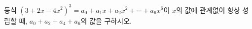 등식 $(3+2x-4x^2)^3=a_0+a_1x+a_2x^2+\cdots+a_6x^6$이 $x$의 값에 관계없이 항상 성립할 때, $a_0+a_2+a_4+a_6$의 값을 구하시오. 
